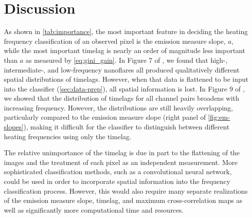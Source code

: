 \section{Discussion}\label{sec:discussion}



As shown in \autoref{tab:importance}, the most important feature in deciding the heating frequency classification of an observed pixel is the emission measure slope, $a$, while the most important timelag is nearly an order of magnitude less important than $a$ as measured by \autoref{eq:gini_gain}. In Figure 7 of , we found that high-, intermediate-, and low-frequency nanoflares all produced qualitatively different spatial distributions of timelags. However, when that data is flattened to be input into the classifier (\autoref{sec:data-prep}), all spatial information is lost. In Figure 9 of , we showed that the distribution of timelags for all channel pairs broadens with increasing frequency. However, the distributions are still heavily overlapping, particularly compared to the emission measure slope (right panel of \autoref{fig:em-slopes}), making it difficult for the classifier to distinguish between different heating frequencies using only the timelag.


The relative unimportance of the timelag is due in part to the flattening of the images and the treatment of each pixel as an independent measurement. More sophisticated classification methods, such as a convolutional neural network, could be used in order to incorporate spatial information into the frequency classification process. However, this would also require many separate realizations of the emission measure slope, timelag, and maximum cross-correlation maps as well as significantly more computational time and resources.

